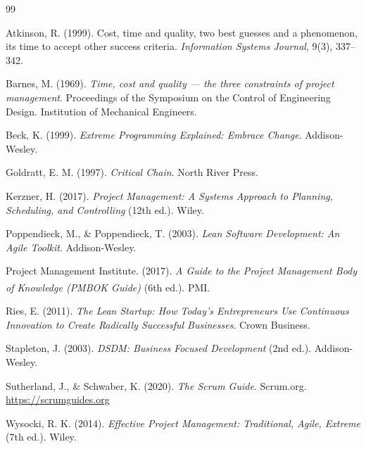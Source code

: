 \documentclass[11pt,a4paper]{article}
\begin{document}
\begin{thebibliography}{99}

Atkinson, R. (1999). Cost, time and quality, two best guesses and a
phenomenon, its time to accept other success criteria. \emph{Information
Systems Journal}, 9(3), 337--342.

Barnes, M. (1969). \emph{Time, cost and quality --- the three constraints
of project management}. Proceedings of the Symposium on the Control of
Engineering Design. Institution of Mechanical Engineers.

Beck, K. (1999). \emph{Extreme Programming Explained: Embrace Change}.
Addison-Wesley.

Goldratt, E. M. (1997). \emph{Critical Chain}. North River Press.

Kerzner, H. (2017). \emph{Project Management: A Systems Approach to
Planning, Scheduling, and Controlling} (12th ed.). Wiley.

Poppendieck, M., \& Poppendieck, T. (2003). \emph{Lean Software
Development: An Agile Toolkit}. Addison-Wesley.

Project Management Institute. (2017). \emph{A Guide to the Project
Management Body of Knowledge (PMBOK\textsuperscript{\textregistered}
Guide)} (6th ed.). PMI.

Ries, E. (2011). \emph{The Lean Startup: How Today's Entrepreneurs Use
Continuous Innovation to Create Radically Successful Businesses}. Crown
Business.

Stapleton, J. (2003). \emph{DSDM: Business Focused Development} (2nd
ed.). Addison-Wesley.

Sutherland, J., \& Schwaber, K. (2020). \emph{The Scrum Guide}.
Scrum.org. \url{https://scrumguides.org}

Wysocki, R. K. (2014). \emph{Effective Project Management: Traditional,
Agile, Extreme} (7th ed.). Wiley.

\end{thebibliography}
\end{document}

